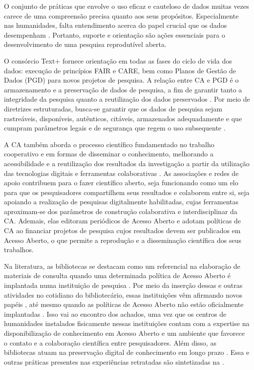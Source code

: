 \documentclass[portuguese]{textolivre}
\begin{document}
O conjunto de práticas que envolve o uso eficaz e cauteloso de dados muitas vezes carece de uma compreensão precisa quanto aos seus propósitos. Especialmente nas humanidades, falta entendimento acerca do papel crucial que os dados desempenham \cite{learn2017,taylor2022}. Portanto, suporte e orientação são ações essenciais para o desenvolvimento de uma pesquisa reprodutível aberta.

O consórcio Text+ fornece orientação em todas as fases do ciclo de vida dos dados: execução de princípios FAIR e CARE, bem como Planos de Gestão de Dados (PGD) para novos projetos de pesquisa. A relação entre CA e PGD é o armazenamento e a preservação de dados de pesquisa, a fim de garantir tanto a integridade da pesquisa quanto a reutilização dos dados preservados \cite{botevericad2022}. Por meio de diretrizes estruturadas, busca-se garantir que os dados de pesquisa sejam rastreáveis, disponíveis, autênticos, citáveis, armazenados adequadamente e que cumpram parâmetros legais e de segurança que regem o uso subsequente \cite{learn2017}.

A CA também aborda o processo científico fundamentado no trabalho cooperativo e em formas de disseminar o conhecimento, melhorando a acessibilidade e a reutilização dos resultados da investigação a partir da utilização das tecnologias digitais e ferramentas colaborativas \cite{morais2021}. As associações e redes de apoio contribuem para o fazer científico aberto, seja funcionando como um elo para que os pesquisadores compartilhem seus resultados e colaborem entre si, seja apoiando a realização de pesquisas digitalmente habilitadas, cujas ferramentas aproximam-se dos parâmetros de construção colaborativa e interdisciplinar da CA. Ademais, elas editoram periódicos de Acesso Aberto e adotam políticas de CA ao financiar projetos de pesquisa cujos resultados devem ser publicados em Acesso Aberto, o que permite a reprodução e a disseminação científica dos seus trabalhos.

Na literatura, as bibliotecas se destacam como um referencial na elaboração de materiais de consulta quando uma determinada política de Acesso Aberto é implantada numa instituição de pesquisa \cite{liu2023}. Por meio da inserção dessas e outras atividades no cotidiano do bibliotecário, essas instituições vêm afirmando novos papéis \cite{cryer2011}, até mesmo quando as políticas de Acesso Aberto não estão oficialmente implantadas \cite{harrington2022}. Isso vai ao encontro dos achados, uma vez que os centros de humanidades instalados fisicamente nessas instituições contam com a expertise na disponibilização de conhecimento em Acesso Aberto e um ambiente que favorece o contato e a colaboração científica entre pesquisadores. Além disso, as bibliotecas atuam na preservação digital de conhecimento em longo prazo \cite{anyaoku2019}. Essa e outras práticas presentes nas experiências retratadas são sintetizadas na .
\end{document}
